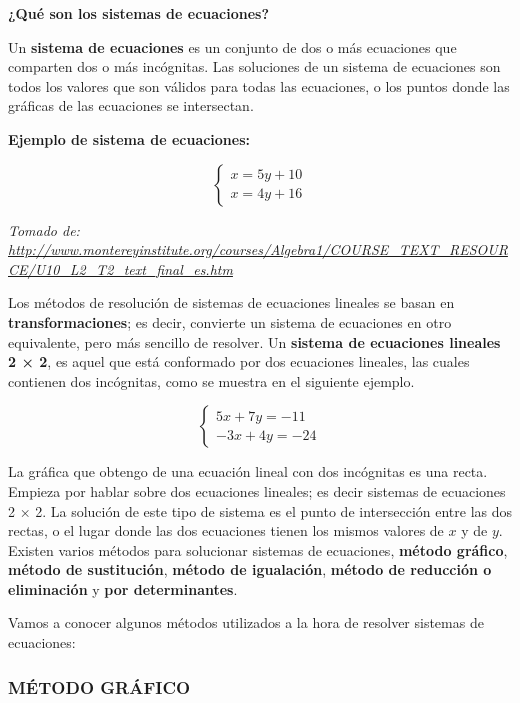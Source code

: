 \documentclass[12pt,a4paper]{article}
\begin{document}
\begin{tcolorbox}[colback=fondorosa,colframe=rojoclaro,title=MINI EXPLICACIÓN SISTEMAS DE ECUACIONES,breakable]

\textbf{¿Qué son los sistemas de ecuaciones?}

Un \textbf{sistema de ecuaciones} es un conjunto de dos o más ecuaciones que comparten dos o más incógnitas. Las soluciones de un sistema de ecuaciones son todos los valores que son válidos para todas las ecuaciones, o los puntos donde las gráficas de las ecuaciones se intersectan.

\textbf{Ejemplo de sistema de ecuaciones:}

\[ \begin{cases}
x = 5y + 10 \\
x = 4y + 16
\end{cases} \]

\textit{Tomado de: \url{http://www.montereyinstitute.org/courses/Algebra1/COURSE_TEXT_RESOURCE/U10_L2_T2_text_final_es.htm}}

Los métodos de resolución de sistemas de ecuaciones lineales se basan en \textbf{transformaciones}; es decir, convierte un sistema de ecuaciones en otro equivalente, pero más sencillo de resolver. Un \textbf{sistema de ecuaciones lineales 2 × 2}, es aquel que está conformado por dos ecuaciones lineales, las cuales contienen dos incógnitas, como se muestra en el siguiente ejemplo.

\[ \begin{cases}
5x + 7y = -11 \\
-3x + 4y = -24
\end{cases} \]

La gráfica que obtengo de una ecuación lineal con dos incógnitas es una recta. Empieza por hablar sobre dos ecuaciones lineales; es decir sistemas de ecuaciones 2 × 2. La solución de este tipo de sistema es el punto de intersección entre las dos rectas, o el lugar donde las dos ecuaciones tienen los mismos valores de $x$ y de $y$. Existen varios métodos para solucionar sistemas de ecuaciones, \textbf{método gráfico}, \textbf{método de sustitución}, \textbf{método de igualación}, \textbf{método de reducción o eliminación} y \textbf{por determinantes}.

\end{tcolorbox}

Vamos a conocer algunos métodos utilizados a la hora de resolver sistemas de ecuaciones:

\subsubsection*{MÉTODO GRÁFICO}
\end{document}
